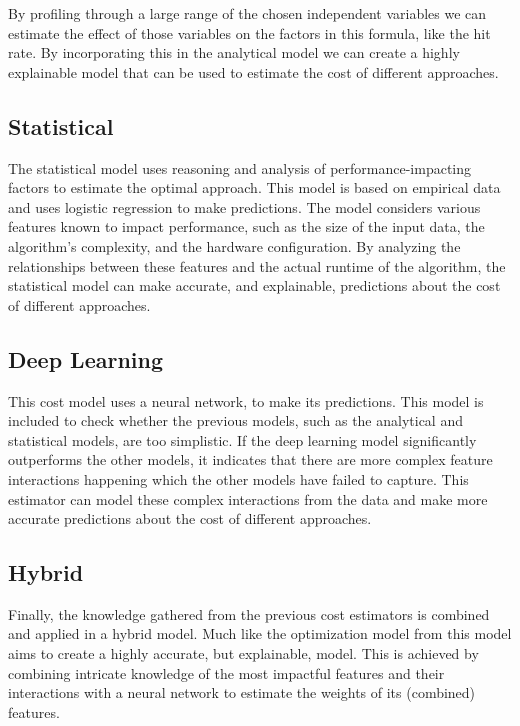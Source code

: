 By profiling through a large range of the chosen independent variables we can estimate the effect of those variables on the factors in this formula, like the hit rate. By incorporating this in the analytical model we can create a highly explainable model that can be used to estimate the cost of different approaches.

\subsection{Statistical}
The statistical model uses reasoning and analysis of performance-impacting factors to estimate the optimal approach. This model is based on empirical data and uses logistic regression to make predictions. The model considers various features known to impact performance, such as the size of the input data, the algorithm's complexity, and the hardware configuration. By analyzing the relationships between these features and the actual runtime of the algorithm, the statistical model can make accurate, and explainable, predictions about the cost of different approaches.

\subsection{Deep Learning}
This cost model uses a neural network, to make its predictions. This model is included to check whether the previous models, such as the analytical and statistical models, are too simplistic. If the deep learning model significantly outperforms the other models, it indicates that there are more complex feature interactions happening which the other models have failed to capture. This estimator can model these complex interactions from the data and make more accurate predictions about the cost of different approaches.

\subsection{Hybrid}
Finally, the knowledge gathered from the previous cost estimators is combined and applied in a hybrid model. Much like the optimization model from \cite{halide_cost_model} this model aims to create a highly accurate, but explainable, model. This is achieved by combining intricate knowledge of the most impactful features and their interactions with a neural network to estimate the weights of its (combined) features.


